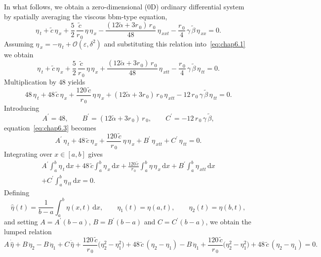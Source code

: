 \documentclass[alpha-refs, 12pt]{wiley-article}
\renewcommand{\O}{\mathcal{O}}
\newcommand{\ud}{\mathrm{d}}
\newcommand{\eps}{\varepsilon}
\begin{document}
In what follows, we obtain a zero-dimensional (0D) ordinary differential system by spatially averaging the viscous \acrshort{bbm}-type equation,
\begin{equation}\label{eq:chap6.1}
  \eta_{\,t}
  +\tilde{c}\,\eta_{\,x}
  +\frac{5}{2}\,\frac{\tilde{c}}{r_{\,0}}\,\eta\,\eta_{\,x}
  -\frac{(12\tilde{\alpha}+3r_{\,0})\,r_{\,0}}{48}\,\eta_{\,xxt}
  -\frac{r_{\,0}}{4}\,\gamma\,\tilde{\beta}\,\eta_{\,xx}=0.
\end{equation}
Assuming
\(\eta_{\,x}=-\eta_{\,t} + \O(\eps,\delta^{2})\) and substituting this
relation into~\eqref{eq:chap6.1} we obtain
\begin{equation}\label{eq:chap6.2}
  \eta_{\,t}
  +\tilde{c}\,\eta_{\,x}
  +\frac{5}{2}\,\frac{\tilde{c}}{r_{\,0}}\,\eta\,\eta_{\,x}
  +\frac{(12\tilde{\alpha}+3r_{\,0})\,r_{\,0}}{48}\,\eta_{\,xtt}
  -\frac{r_{\,0}}{4}\,\gamma\,\tilde{\beta}\,\eta_{\,tt}=0.
\end{equation}
Multiplication by \(48\) yields
\begin{equation}\label{eq:chap6.3}
  48\,\eta_{\,t}
  +48\,\tilde{c}\,\eta_{\,x}
  +\frac{120\,\tilde{c}}{r_{\,0}}\,\eta\,\eta_{\,x}
  +(12\tilde{\alpha}+3r_{\,0})\,r_{\,0}\,\eta_{\,xtt}
  -12\,r_{\,0}\,\gamma\,\tilde{\beta}\,\eta_{\,tt}=0.
\end{equation}
Introducing
\[
  A^{\prime}=48,\qquad
  B^{\prime}=(12\tilde{\alpha}+3r_{\,0})\,r_{\,0},\qquad
  C^{\prime}=-12\,r_{\,0}\,\gamma\,\tilde{\beta},
\]
equation~\eqref{eq:chap6.3} becomes
\begin{equation}
  A^{\prime}\,\eta_{\,t}
  +48\,\tilde{c}\,\eta_{\,x}
  +\frac{120\,\tilde{c}}{r_{\,0}}\,\eta\,\eta_{\,x}
  +B^{\prime}\,\eta_{\,xtt}
  +C^{\prime}\,\eta_{\,tt}=0.
\end{equation}
Integrating over \(x\in[a,b]\) gives
\begin{multline}\label{eq:chap6.4}
  A^{\prime}\int_{a}^{b}\eta_{\,t}\,\ud x
  +48\,\tilde{c}\int_{a}^{b}\eta_{\,x}\,\ud x
  +\frac{120\,\tilde{c}}{r_{\,0}}\int_{a}^{b}\eta\,\eta_{\,x}\,\ud x
  +B^{\prime}\int_{a}^{b}\eta_{\,xtt}\,\ud x\\
  +C^{\prime}\int_{a}^{b}\eta_{\,tt}\,\ud x=0.
\end{multline}
Defining
\[
  \hat{\eta}(t)=\frac{1}{b-a}\int_{a}^{b}\eta(x,t)\,\ud x,\qquad
  \eta_{1}(t)=\eta(a,t),\qquad
  \eta_{2}(t)=\eta(b,t),
\]
and setting
\(A=A^{\prime}(b-a)\), \(B=B^{\prime}(b-a)\) and
\(C=C^{\prime}(b-a)\), we obtain the lumped relation
\begin{equation}\label{eq:chap6.5}
  A\,\dot{\hat{\eta}}
  +B\,\ddot{\eta}_{2}
  -B\,\ddot{\eta}_{1}
  +C\,\ddot{\hat{\eta}}
  +\frac{120\,\tilde{c}}{r_{\,0}}\bigl(\eta_{2}^{2}-\eta_{1}^{2}\bigr)
  +48\,\tilde{c}\,(\eta_{2}-\eta_{1})
  -B\,\ddot{\eta}_{1}
  +\frac{120\,\tilde{c}}{r_{\,0}}\bigl(\eta_{2}^{2}-\eta_{1}^{2}\bigr)
  +48\,\tilde{c}\,(\eta_{2}-\eta_{1})=0.
\end{equation}
\end{document}
